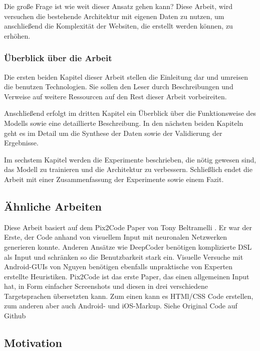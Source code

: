 \documentclass[pdftex,a4paper,halfparskip, article]{scrartcl}
\begin{document}
Die große Frage ist wie weit dieser Ansatz gehen kann? Diese Arbeit, wird versuchen die bestehende Architektur mit eigenen Daten zu nutzen, um anschließend die Komplexität der Websiten, die erstellt werden können, zu erhöhen.

\subsubsection*{Überblick über die Arbeit}

Die ersten beiden Kapitel dieser Arbeit stellen die Einleitung dar und umreisen die benutzen Technologien. Sie sollen den Leser durch Beschreibungen und Verweise auf weitere Ressourcen auf den Rest dieser Arbeit vorbeireiten.

Anschließend erfolgt im dritten Kapitel ein Überblick über die Funktionsweise des Modells sowie eine detaillierte Beschreibung. In den nächsten beiden Kapiteln geht es im Detail um die Synthese der Daten sowie der Validierung der Ergebnisse. 

Im sechstem Kapitel werden die Experimente beschrieben, die nötig gewesen sind, das Modell zu trainieren und die Architektur zu verbessern. Schließlich endet die Arbeit mit einer Zusammenfassung der Experimente sowie einem Fazit.

\subsection{Ähnliche Arbeiten}

Diese Arbeit basiert auf dem Pix2Code Paper von Tony Beltramelli \cite{Beltramelli17}. Er war der Erste, der Code anhand von visuellem Input mit neuronalen Netzwerken generieren konnte. 
Anderen Ansätze wie DeepCoder \cite{DeepCoder16} benötigen komplizierte DSL als Input und schränken so die Benutzbarkeit stark ein. Visuelle Versuche mit Android-GUIs von Nguyen \cite{Nguyen15} benötigen ebenfalls unpraktische von Experten erstellte Heuristiken. Pix2Code ist das erste Paper, das einen allgemeinen Input hat, in  Form einfacher Screenshots und diesen in drei verschiedene Targetsprachen übersetzten kann. Zum einen kann es HTMl/CSS Code erstellen, zum anderen aber auch Android- und iOS-Markup. Siehe Original Code auf Github \cite{Beltramelli17Github}

\subsection{Motivation}
\end{document}
